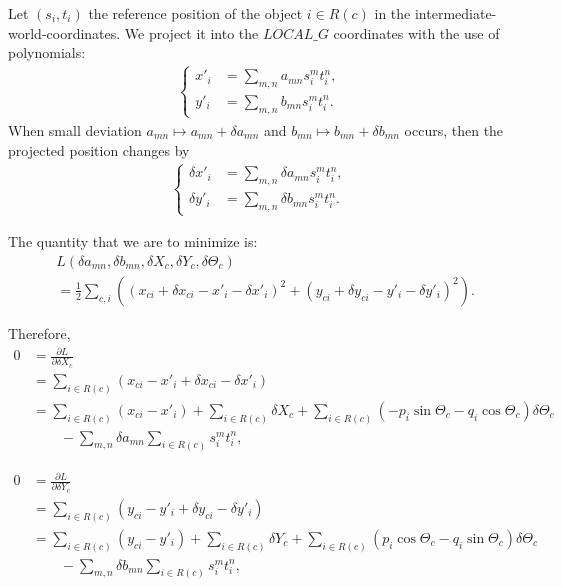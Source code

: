 \documentclass{scrartcl}
\begin{document}
Let $(s_i, t_i)$ the reference position of the object $i \in R(c)$
in the intermediate-world-coordinates. We project it into the $LOCAL\_G$ coordinates
with the use of polynomials:
\begin{align}
    \left\{\begin{aligned}
        x'_i &= \sum_{m,n} a_{mn} s_i^m t_i^n
    ,\\ y'_i &= \sum_{m,n} b_{mn} s_i^m t_i^n
    .
    \end{aligned}\right.
\end{align}
When small deviation $a_{mn} \mapsto a_{mn} + \delta a_{mn}$
and $b_{mn} \mapsto b_{mn} + \delta b_{mn}$ occurs, then the projected
position changes by
\begin{align}
    \left\{\begin{aligned}
        \delta x'_i &= \sum_{m,n} \delta a_{mn} s_i^m t_i^n
    ,\\ \delta y'_i &= \sum_{m,n} \delta b_{mn} s_i^m t_i^n
    .
    \end{aligned}\right.
\end{align}

The quantity that we are to minimize is:
\begin{align}
&   L(\delta a_{mn}, \delta b_{mn}, \delta X_c, \delta Y_c, \delta\Theta_c)
\\  &= \frac{1}{2} \sum_{c,i} \left(
        \left( x_{ci} + \delta x_{ci} - x'_i - \delta x'_i \right)^2
        + \left( y_{ci} + \delta y_{ci} - y'_i - \delta y'_i \right)^2
        \right)
    .
\end{align}

Therefore,
\begin{align}
    0
    &= \frac{\partial L}{\partial \delta X_{c}}
\\  &= \sum_{i \in R(c)} \left( x_{ci} - x'_i + \delta x_{ci} - \delta x'_i\right)
\\  &= \sum_{i \in R(c)} \left( x_{ci} - x'_i \right)
        + \sum_{i \in R(c)} \delta X_{c}
        + \sum_{i \in R(c)} \left(- p_i \sin \Theta_c - q_i \cos \Theta_c \right) \delta \Theta_c
            \nonumber \\ & \qquad
        - \sum_{m,n} \delta a_{mn} \sum_{i \in R(c)} s_i^{m} t_i^{n}
,
\end{align}

\begin{align}
    0
    &= \frac{\partial L}{\partial \delta Y_{c}}
\\  &= \sum_{i \in R(c)} \left( y_{ci} - y'_i + \delta y_{ci} - \delta y'_i\right)
\\  &= \sum_{i \in R(c)} \left( y_{ci} - y'_i \right)
        + \sum_{i \in R(c)} \delta Y_{c}
        + \sum_{i \in R(c)} \left(p_i \cos \Theta_c - q_i \sin \Theta_c \right) \delta \Theta_c
            \nonumber \\ & \qquad
        - \sum_{m,n} \delta b_{mn} \sum_{i \in R(c)} s_i^{m} t_i^{n}
,
\end{align}
\end{document}
